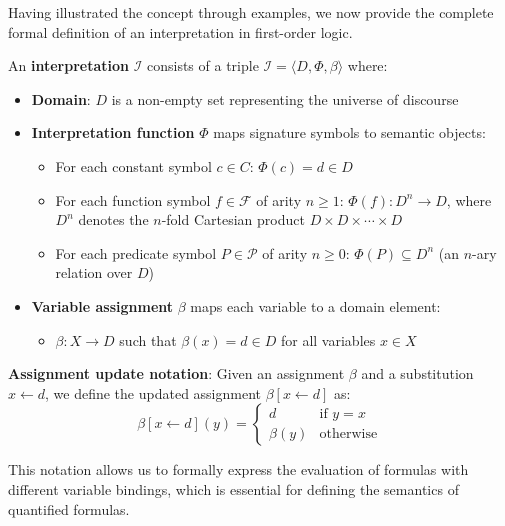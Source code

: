 \documentclass[11pt,a4paper]{article}
\theoremstyle{definition}
\theoremstyle{plain}
\theoremstyle{remark}
\begin{document}
Having illustrated the concept through examples, we now provide the complete formal definition of an interpretation in first-order logic.

An \textbf{interpretation} $\mathcal{I}$ consists of a triple $\mathcal{I} = \langle D, \Phi, \beta \rangle$ where:

\begin{itemize}
    \item \textbf{Domain}: $D$ is a non-empty set representing the universe of discourse
    
    \item \textbf{Interpretation function} $\Phi$ maps signature symbols to semantic objects:
    \begin{itemize}
        \item For each constant symbol $c \in C$: $\Phi(c) = d \in D$
        \item For each function symbol $f \in \mathcal{F}$ of arity $n \geq 1$: $\Phi(f) : D^n \rightarrow D$, where $D^n$ denotes the $n$-fold Cartesian product $D \times D \times \cdots \times D$
        \item For each predicate symbol $P \in \mathcal{P}$ of arity $n \geq 0$: $\Phi(P) \subseteq D^n$ (an $n$-ary relation over $D$)
    \end{itemize}
    
    \item \textbf{Variable assignment} $\beta$ maps each variable to a domain element:
    \begin{itemize}
        \item $\beta : X \rightarrow D$ such that $\beta(x) = d \in D$ for all variables $x \in X$
    \end{itemize}
\end{itemize}

\textbf{Assignment update notation}: Given an assignment $\beta$ and a substitution $x \leftarrow d$, we define the updated assignment $\beta[x \leftarrow d]$ as:
\[
\beta[x \leftarrow d](y) = 
\begin{cases}
d & \text{if } y = x \\
\beta(y) & \text{otherwise}
\end{cases}
\]

This notation allows us to formally express the evaluation of formulas with different variable bindings, which is essential for defining the semantics of quantified formulas.
\end{document}
